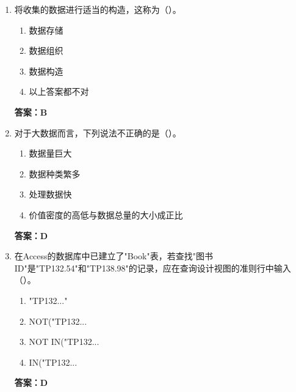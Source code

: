 \documentclass[12pt, a4paper]{article}
\begin{document}
\begin{enumerate}[label=\arabic*.]
	\item 将收集的数据进行适当的构造，这称为（\quad）。
	      \begin{enumerate}
		      \item 数据存储
		      \item 数据组织
		      \item 数据构造
		      \item 以上答案都不对
	      \end{enumerate}
	      \textbf{答案：B}

	\item 对于大数据而言，下列说法不正确的是（\quad）。
	      \begin{enumerate}
		      \item 数据量巨大
		      \item 数据种类繁多
		      \item 处理数据快
		      \item 价值密度的高低与数据总量的大小成正比
	      \end{enumerate}
	      \textbf{答案：D}

	\item 在Access的数据库中已建立了"Book"表，若查找"图书ID"是"TP132.54"和"TP138.98"的记录，应在查询设计视图的准则行中输入（\quad）。
	      \begin{enumerate}
		      \item "TP132..."
		      \item NOT("TP132...
		      \item NOT IN("TP132...
		      \item IN("TP132...
	      \end{enumerate}
	      \textbf{答案：D}
\end{enumerate}
\end{document}
